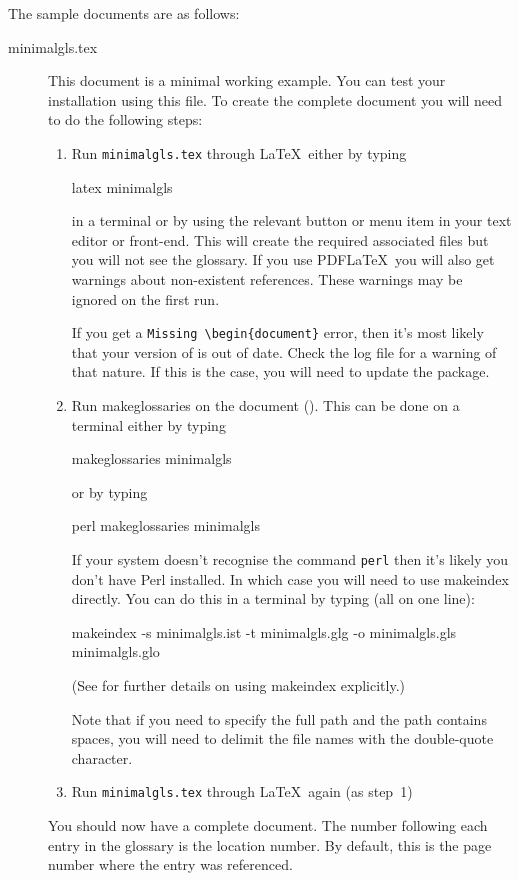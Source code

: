 \documentclass[report]{nlctdoc}
\begin{document}
The sample documents are as follows:
\begin{description}
\item[minimalgls.tex]\label{ex:minimalgls} This document is a
minimal working example. You can test your installation using this
file. To create the complete document you will need to do the
following steps:
  \begin{enumerate}
  \item Run \texttt{minimalgls.tex} through \LaTeX\ either by 
  typing
\begin{prompt}
latex minimalgls
\end{prompt}
  in a terminal or by using the relevant button or menu item in
  your text editor or front-end. This will create the required 
  associated files but you will not see the glossary. If you use 
  PDF\LaTeX\ you will also get warnings about non-existent 
  references. These warnings may be ignored on the first run.

  If you get a \verb"Missing \begin{document}" error, then 
  it's most likely that your version of  is 
  out of date. Check the log file for a warning of that nature. 
  If this is the case, you will need to update the 
  package.

  \item Run \gls{makeglossaries} on the document (). This can
  be done on a terminal either by typing
\begin{prompt}
makeglossaries minimalgls
\end{prompt}
  or by typing
\begin{prompt}
perl makeglossaries minimalgls
\end{prompt}
  If your system doesn't recognise the command \texttt{perl} then
  it's likely you don't have Perl installed. In which case you
  will need to use \gls{makeindex} directly. You can do this
  in a terminal by typing (all on one line):
\begin{prompt}
makeindex -s minimalgls.ist -t minimalgls.glg -o minimalgls.gls minimalgls.glo
\end{prompt}
  (See  for further details on using 
   \gls*{makeindex} explicitly.)

  Note that if you need to specify the full path and the path
  contains spaces, you will need to delimit the file names with
  the double-quote character.

  \item Run \texttt{minimalgls.tex} through \LaTeX\ again (as step~1)
  \end{enumerate}
You should now have a complete document. The number following
each entry in the glossary is the location number. By default, this 
is the page number where the entry was referenced.


\end{description}
\end{document}
